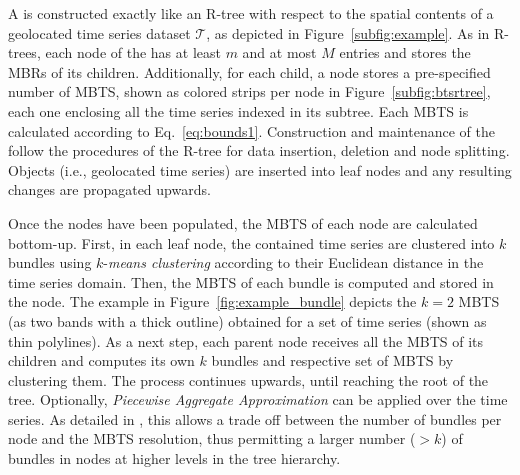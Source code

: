 A \btsr is constructed exactly like an R-tree \cite{Guttman1984} with respect to the spatial contents of a geolocated time series dataset $\mathcal{T}$, as depicted in Figure~\ref{subfig:example}. As in R-trees, each node of the \btsr has at least $m$ and at most $M$ entries and stores the MBRs of its children. Additionally, for each child, a node stores a pre-specified number of MBTS, shown as colored strips per node in Figure~\ref{subfig:btsrtree}, each one enclosing all the time series indexed in its subtree. Each MBTS is calculated according to Eq.~\ref{eq:bounds1}. Construction and maintenance of the \btsr follow the procedures of the R-tree for data insertion, deletion and node splitting. Objects (i.e., geolocated time series) are inserted into leaf nodes and any resulting changes are propagated upwards.

Once the nodes have been populated, the MBTS of each node are calculated bottom-up. First, in each leaf node, the contained time series are clustered into $k$ bundles using $k$-{\em means clustering} according to their Euclidean distance in the time series domain. Then, the MBTS of each bundle is computed and stored in the node. The example in Figure~\ref{fig:example_bundle} depicts the $k=2$ MBTS (as two bands with a thick outline) obtained for a set of time series (shown as thin polylines). As a next step, each parent node receives all the MBTS of its children and computes its own $k$ bundles and respective set of MBTS by clustering them. The process continues upwards, until reaching the root of the tree. Optionally, \emph{Piecewise Aggregate Approximation} \cite{keogh2001paa,faloutsos2000vldb} can be applied over the time series. As detailed in \cite{chatzig17btsr}, this allows a trade off between the number of bundles per node and the MBTS resolution, thus permitting a larger number ($>k$) of bundles in nodes at higher levels in the tree hierarchy.



